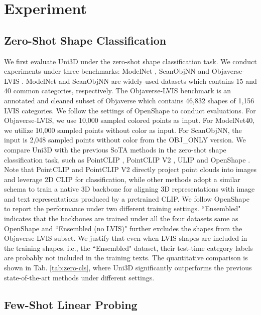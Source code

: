 \documentclass{article} \usepackage{iclr2024_conference,times}
\def\Ours{Uni3D\xspace}
\begin{document}
\section{Experiment}

\subsection{Zero-Shot Shape Classification}


We first evaluate \Ours under the zero-shot shape classification task. We conduct experiments under three benchmarks: ModelNet \citep{wu20153d}, ScanObjNN \citep{uy2019revisiting} and Objaverse-LVIS \citep{deitke2023objaverse}. ModelNet and ScanObjNN are widely-used datasets which contains 15 and 40 common categories, respectively. The Objaverse-LVIS benchmark is an annotated and cleaned subset of Objaverse which contains 46,832 shapes of 1,156 LVIS categories.
We follow the settings of OpenShape \citep{liu2023openshape} to conduct evaluations. For Objaverse-LVIS, we use 10,000 sampled colored points as input. For ModelNet40, we utilize 10,000 sampled points without color as input. For ScanObjNN, the input is 2,048 sampled points without color from the OBJ\_ONLY version.
We compare \Ours with the previous SoTA methods in the zero-shot shape classification task, such as PointCLIP \citep{zhang2022pointclip}, PointCLIP V2 \citep{zhu2022pointclipv2}, ULIP \citep{xue2023ulip} and OpenShape \citep{liu2023openshape}. Note that PointCLIP and PointCLIP V2 directly project point clouds into images and leverage 2D CLIP for classification, while other methods adopt a similar schema to train a native 3D backbone for aligning 3D representations with image and text representations produced by a pretrained CLIP. We follow OpenShape \citep{liu2023openshape} to report the performance under two different training settings. ``Ensembled" indicates that the backbones are trained under all the four datasets same as OpenShape and ``Ensembled (no LVIS)" further excludes the shapes from the Objaverse-LVIS subset. We justify that even when LVIS shapes are included in the training shapes, i.e., the ``Ensembled" dataset, their test-time category labels are probably not included in the training texts. 
The quantitative comparison is shown in Tab. \ref{tab:zero-cls}, where \Ours significantly outperforms the previous state-of-the-art methods under different settings. 
  



\subsection{Few-Shot Linear Probing}
\end{document}
